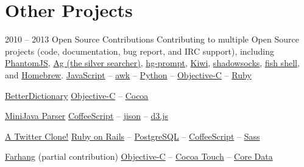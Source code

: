 \documentclass{tccv}
\begin{document}
{{\section{Other Projects}

\begin{project_list}
	 
\item{2010 -- 2013}
	 {}
	 {Open Source Contributions}
	 {Contributing to multiple Open Source projects (code, documentation, bug report, and IRC support), \mbox{including} %
	 \href{http://phantomjs.org}{PhantomJS}, %
	 \href{https://github.com/ggreer/the_silver_searcher}{Ag (the silver searcher)}, %
	 \href{http://bitbucket.org/sjl/hg-prompt/}{hg-prompt}, %
	 \href{https://github.com/allending/Kiwi}{Kiwi}, %
	 \href{https://github.com/clowwindy/shadowsocks/}{shadowsocks}, %
	 \href{http://fishshell.com}{fish shell}, and %
	 \href{https://github.com/mxcl/homebrew}{Homebrew}.}%
	 {%
	 	\href{https://developer.mozilla.org/en-US/docs/Web/JavaScript}{JavaScript} -- %
	 	\href{http://awk.info}{awk} -- %
		\href{http://python.org}{Python} -- %
		\href{https://en.wikipedia.org/wiki/Objective-C}{Objective-C} -- %
		\href{https://www.ruby-lang.org/en/}{Ruby}%
	 }
	 
\end{project_list}

\begin{oneline_projects}

\item{\href{http://pooriaazimi.github.io/BetterDictionary/}{BetterDictionary}}
	 {%
	 	\href{https://en.wikipedia.org/wiki/Objective-C}{Objective-C} -- %
		\href{https://en.wikipedia.org/wiki/Cocoa_(API)}{Cocoa}%
	 }	

\item{\href{https://github.com/pooriaazimi/Mini-Java}{MiniJava Parser}}
	 {%
		 \href{http://coffeescript.org}{CoffeeScript} -- %
		 \href{http://zaach.github.io/jison/}{jison} -- %
		 \href{http://d3js.org}{d3.js}%
	 }

\item{\href{https://github.com/pooriaazimi/twitter}{A Twitter Clone!}}
	 {%
		 \href{http://rubyonrails.org}{Ruby on Rails} -- %
		 \href{http://www.postgresql.org}{PostgreSQL} -- %
		 \href{http://coffeescript.org}{CoffeeScript} -- %
		 \href{http://sass-lang.com}{Sass}%
	 }


\item{\href{http://www.turnedondigital.com/?portfolio=farhang-iphone-app}{Farhang} \large{\rm(partial contribution)}}
	 {%
	 	\href{https://en.wikipedia.org/wiki/Objective-C}{Objective-C} -- %
		\href{https://en.wikipedia.org/wiki/Cocoa_Touch}{Cocoa Touch} -- %
		\href{https://en.wikipedia.org/wiki/Core_Data}{Core Data}%
	 }


\end{oneline_projects}}}
\end{document}
